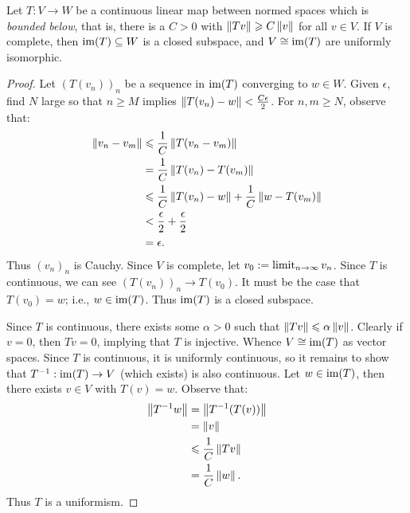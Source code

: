     \begin{proposition}
        Let $T:V \rightarrow W$ be a continuous linear map between normed spaces which is \textit{bounded below}, that is, there is a $C>0$ with $\left\lVert Tv \right\rVert \geqslant C \left\lVert v \right\rVert$ for all $v \in V$. If $V$ is complete, then $\operatorname{im}(T) \subseteq W$ is a closed subspace, and $V \cong \operatorname{im}(T)$ are uniformly isomorphic.
    \end{proposition}
        \begin{proof}
            Let $(T(v_n))_n$ be a sequence in $\operatorname{im}(T)$ converging to $w \in W$. Given $\epsilon$, find $N$ large so that $n \geq M$ implies $\left\lVert T(v_n)-w \right\rVert < \frac{C\epsilon}{2}$. For $n,m \geq N$, observe that:
                \begin{equation*}
                \begin{split}
                    \left\lVert v_n - v_m \right\rVert
                    & \leqslant \frac{1}{C}\left\lVert T(v_n - v_m) \right\rVert \\
                    & = \frac{1}{C}\left\lVert T(v_n) - T(v_m) \right\rVert \\
                    & \leqslant \frac{1}{C}\left\lVert T(v_n) - w \right\rVert + \frac{1}{C}\left\lVert w - T(v_m) \right\rVert \\
                    & < \frac{\epsilon}{2} + \frac{\epsilon}{2} \\
                    & = \epsilon.
                \end{split}
                \end{equation*}
            Thus $(v_n)_n$ is Cauchy. Since $V$ is complete, let $v_0 := \operatorname*{limit}_{n \rightarrow \infty}v_n$. Since $T$ is continuous, we can see $(T(v_n))_n \rightarrow T(v_0)$. It must be the case that $T(v_0) = w$; i.e., $w \in \operatorname{im}(T)$. Thus $\operatorname{im}(T)$ is a closed subspace.

            Since $T$ is continuous, there exists some $\alpha > 0$ such that $\left\lVert Tv \right\rVert \leqslant \alpha \left\lVert  v \right\rVert$. Clearly if $v = 0$, then $Tv = 0$, implying that $T$ is injective. Whence $V \cong \operatorname{im}(T)$ as vector spaces. Since $T$ is continuous, it is uniformly continuous, so it remains to show that $T^{-1}:\operatorname{im}(T) \rightarrow V$ (which exists) is also continuous. Let $w \in \operatorname{im}(T)$, then there exists $v \in V$ with $T(v) = w$. Observe that:
                \begin{equation*}
                \begin{split}
                    \left\lVert T^{-1} w \right\rVert
                    & = \left\lVert T^{-1}(T(v)) \right\rVert \\
                    & = \left\lVert v \right\rVert \\
                    & \leqslant \frac{1}{C}\left\lVert Tv \right\rVert \\
                    & = \frac{1}{C}\left\lVert w \right\rVert.
                \end{split}
                \end{equation*}
            Thus $T$ is a uniformism.
        \end{proof}

